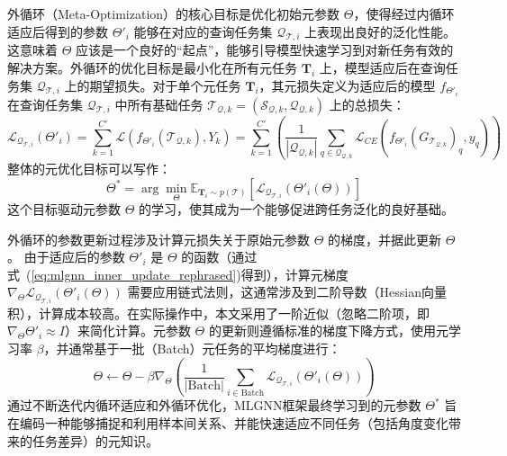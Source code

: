 外循环（Meta-Optimization）的核心目标是优化初始元参数 $\Theta$，使得经过内循环适应后得到的参数 $\Theta'_i$ 能够在对应的查询任务集 $\mathcal{Q}_{\mathcal{T},i}$ 上表现出良好的泛化性能。 这意味着 $\Theta$ 应该是一个良好的“起点”，能够引导模型快速学习到对新任务有效的解决方案。外循环的优化目标是最小化在所有元任务 $\mathbf{T}_i$ 上，模型适应后在查询任务集 $\mathcal{Q}_{\mathcal{T},i}$ 上的期望损失。对于单个元任务 $\mathbf{T}_i$，其元损失定义为适应后的模型 $f_{\Theta'_i}$ 在查询任务集 $\mathcal{Q}_{\mathcal{T},i}$ 中所有基础任务 $\mathcal{T}_{\mathcal{Q},k} = (\mathcal{S}_{\mathcal{Q},k}, \mathcal{Q}_{\mathcal{Q},k})$ 上的总损失：
\begin{equation}
    \mathcal{L}_{\mathcal{Q}_{\mathcal{T},i}}(\Theta'_i) = \sum_{k=1}^{C'} \mathcal{L}(f_{\Theta'_i}(\mathcal{T}_{\mathcal{Q},k}), Y_k) = \sum_{k=1}^{C'} \left( \frac{1}{|\mathcal{Q}_{\mathcal{Q},k}|} \sum_{q \in \mathcal{Q}_{\mathcal{Q},k}} \mathcal{L}_{CE}(f_{\Theta'_i}(G_{\mathcal{T}_{\mathcal{Q},k}})_q, y_q) \right)
    \label{eq:meta_task_query_loss}
\end{equation}
整体的元优化目标可以写作：
\begin{equation}
    \Theta^* = \arg\min_{\Theta} \mathbb{E}_{\mathbf{T}_i \sim p(\mathcal{T})} [\mathcal{L}_{\mathcal{Q}_{\mathcal{T},i}}(\Theta'_i(\Theta))]
    \label{eq:meta_optimization_objective_rephrased}
\end{equation}
这个目标驱动元参数 $\Theta$ 的学习，使其成为一个能够促进跨任务泛化的良好基础。

外循环的参数更新过程涉及计算元损失关于原始元参数 $\Theta$ 的梯度，并据此更新 $\Theta$。 由于适应后的参数 $\Theta'_i$ 是 $\Theta$ 的函数（通过式~(\ref{eq:mlgnn_inner_update_rephrased})得到），计算元梯度 $\nabla_{\Theta} \mathcal{L}_{\mathcal{Q}_{\mathcal{T},i}}(\Theta'_i(\Theta))$ 需要应用链式法则，这通常涉及到二阶导数（Hessian向量积），计算成本较高。在实际操作中，本文采用了一阶近似（忽略二阶项，即 $\nabla_{\Theta} \Theta'_i \approx I$）来简化计算。元参数 $\Theta$ 的更新则遵循标准的梯度下降方式，使用元学习率 $\beta$，并通常基于一批（Batch）元任务的平均梯度进行：
\begin{equation}
    \Theta \leftarrow \Theta - \beta \nabla_{\Theta} \left( \frac{1}{|\text{Batch}|} \sum_{i \in \text{Batch}} \mathcal{L}_{\mathcal{Q}_{\mathcal{T},i}}(\Theta'_i(\Theta)) \right)
    \label{eq:mlgnn_outer_update_rephrased}
\end{equation}
通过不断迭代内循环适应和外循环优化，MLGNN框架最终学习到的元参数 $\Theta^*$ 旨在编码一种能够捕捉和利用样本间关系、并能快速适应不同任务（包括角度变化带来的任务差异）的元知识。

